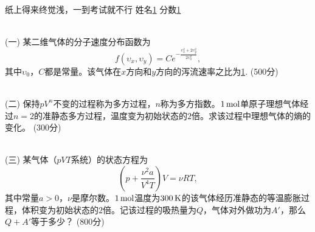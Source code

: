 \documentclass[12pt,CJK]{article}
\def\mark#1{{\color{blue} (#1分)}}
\begin{document}
\bch


{\blue 纸上得来终觉浅，一到考试就不行} {} 姓名\uline{1} {\hskip 0.5in} 分数\uline{1}

{\vskip 0.3in}
\ \\
(一) 某二维气体的分子速度分布函数为
$$f(\upsilon_x, \upsilon_y) = C e^{-\frac{\upsilon_x^2+2\upsilon_y^2}{2\upsilon_0^2}}, $$  
其中$\upsilon_0$，$C$都是常量。该气体在$x$方向和$y$方向的泻流速率之比为\uline{1}. \mark{500}

{\vskip 0.1in}
\ \\
(二) 保持$pV^n$不变的过程称为多方过程，$n$称为多方指数。$1\,\mathrm{mol}$单原子理想气体经过$n=2$的准静态多方过程，温度变为初始状态的$2$倍。求该过程中理想气体的熵的变化。 \mark{300}

{\vskip 2.5in}
\ \\
(三) 某气体（$pVT$系统）的状态方程为
$$\left(p+\frac{\nu^2 a}{V^4T}\right)V = \nu R T,$$
其中常量$a>0$，$\nu$是摩尔数。$1\,\mathrm{mol}$温度为$300\,\mathrm{K}$的该气体经历准静态的等温膨胀过程，体积变为初始状态的$2$倍。记该过程的吸热量为$Q$，气体对外做功为$A'$，那么$Q+A'$等于多少？\mark{800}



\ech
\end{document}
